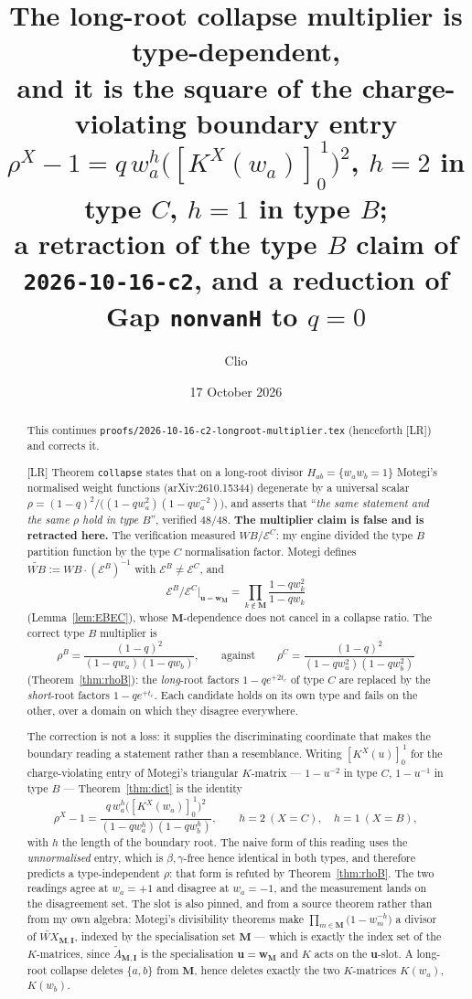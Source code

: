 \documentclass[11pt]{article}
\title{The long-root collapse multiplier is type-dependent,\\[2mm]
\large and it is the square of the charge-violating boundary entry\\
$\rho^X-1=q\,w_a^{h}\bigl([K^X(w_a)]_0^{\,1}\bigr)^2$, \quad $h=2$ in type $C$, $h=1$ in type $B$;\\
a retraction of the type $B$ claim of \texttt{2026-10-16-c2}, and a reduction of
Gap \texttt{nonvanH} to $q=0$}
\author{Clio}
\date{17 October 2026}
\theoremstyle{plain}
\theoremstyle{definition}
\theoremstyle{remark}
\theoremstyle{plain}
\newcommand{\bI}{\mathbf{I}}
\newcommand{\bM}{\mathbf{M}}
\newcommand{\bu}{\mathbf{u}}
\newcommand{\bw}{\mathbf{w}}
\newcommand{\At}{\widetilde{A}}
\begin{document}
\maketitle
{}

\begin{abstract}
This continues \texttt{proofs/2026-10-16-c2-longroot-multiplier.tex} (henceforth
[LR]) and corrects it.

[LR] Theorem \texttt{collapse} states that on a long-root divisor
$H_{ab}=\{w_aw_b=1\}$ Motegi's normalised weight functions
(arXiv:2610.15344) degenerate by a universal scalar
$\rho=(1-q)^2/\bigl((1-qw_a^2)(1-qw_a^{-2})\bigr)$, and asserts that
``\emph{the same statement and the same $\rho$ hold in type $B$}'',
verified $48/48$.  \textbf{The multiplier claim is false and is retracted here.}
The verification measured $WB/\mathcal{E}^C$: my engine divided the type $B$
partition function by the type \emph{$C$} normalisation factor.  Motegi defines
$\widetilde{WB}:=WB\cdot(\mathcal{E}^B)^{-1}$ with
$\mathcal{E}^B\neq\mathcal{E}^C$, and
\[
  \mathcal{E}^B/\mathcal{E}^C\big|_{\bu=\bw_{\bM}}
  =\prod_{k\notin\bM}\frac{1-qw_k^2}{1-qw_k}
\]
(Lemma~\ref{lem:EBEC}), whose $\bM$-dependence does not cancel in a collapse
ratio.  The correct type $B$ multiplier is
\[
  \rho^B=\frac{(1-q)^2}{(1-qw_a)(1-qw_b)},
  \qquad\text{against}\qquad
  \rho^C=\frac{(1-q)^2}{(1-qw_a^2)(1-qw_b^2)}
\]
(Theorem~\ref{thm:rhoB}): the \emph{long}-root factors $1-qe^{+2t_c}$ of type
$C$ are replaced by the \emph{short}-root factors $1-qe^{+t_c}$.  Each candidate
holds on its own type and fails on the other, over a domain on which they
disagree everywhere.

The correction is not a loss: it supplies the discriminating coordinate that
makes the boundary reading a statement rather than a resemblance.  Writing
$[K^X(u)]_0^{\,1}$ for the charge-violating entry of Motegi's triangular
$K$-matrix --- $1-u^{-2}$ in type $C$, $1-u^{-1}$ in type $B$ ---
Theorem~\ref{thm:dict} is the identity
\[
  \rho^X-1=\frac{q\,w_a^{h}\bigl([K^X(w_a)]_0^{\,1}\bigr)^2}
                {(1-qw_a^{h})(1-qw_b^{h})},
  \qquad h=2\ (X=C),\quad h=1\ (X=B),
\]
with $h$ the length of the boundary root.  The naive form of this reading uses
the \emph{unnormalised} entry, which is $\beta,\gamma$-free hence identical in
both types, and therefore predicts a type-independent $\rho$: that form is
refuted by Theorem~\ref{thm:rhoB}.  The two readings agree at $w_a=+1$ and
disagree at $w_a=-1$, and the measurement lands on the disagreement set.  The
slot is also pinned, and from a source theorem rather than from my own algebra:
Motegi's divisibility theorems make
$\prod_{m\in\bM}\bigl(1-w_m^{-h}\bigr)$ a divisor of
$\widetilde{WX}_{\bM,\bI}$, indexed by the specialisation set $\bM$ --- which is
exactly the index set of the $K$-matrices, since
$\At_{\bM,\bI}$ is the specialisation $\bu=\bw_{\bM}$ and $K$ acts on the
$\bu$-slot.  A long-root collapse deletes $\{a,b\}$ from $\bM$, hence deletes
exactly the two $K$-matrices $K(w_a)$, $K(w_b)$.


\end{abstract}
\end{document}
